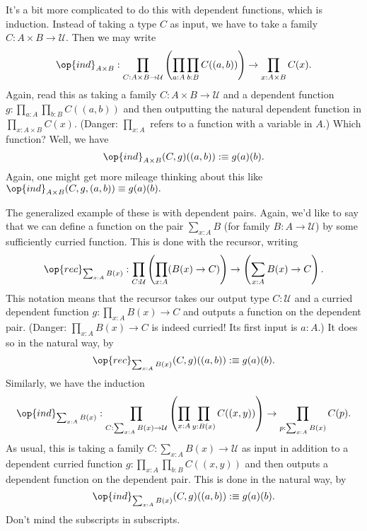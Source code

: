 It's a bit more complicated to do this with dependent functions, which is induction. Instead of taking a type $C$ as input, we have to take a family $C:A\times B\to\mathcal U.$ Then we may write
\[\op{ind}_{A\times B}:\prod_{C:A\times B\to\mathcal U}\left(\prod_{a:A}\prod_{b:B}C((a,b))\right)\to\prod_{x:A\times B}C(x).\]
Again, read this as taking a family $C:A\times B\to\mathcal U$ and a dependent function $g:\prod_{a:A}\prod_{b:B}C((a,b))$ and then outputting the natural dependent function in $\prod_{x:A\times B}C(x).$ (Danger: $\prod_{x:A}$ refers to a function with a variable in $A.$) Which function? Well, we have
\[\op{ind}_{A\times B}(C,g)((a,b)):\equiv g(a)(b).\]
Again, one might get more mileage thinking about this like $\op{ind}_{A\times B}(C,g,(a,b))\equiv g(a)(b).$

The generalized example of these is with dependent pairs. Again, we'd like to say that we can define a function on the pair $\sum_{x:A}B$ (for family $B:A\to\mathcal U$) by some sufficiently curried function. This is done with the recursor, writing
\[\op{rec}_{\sum_{x:A}B(x)}:\prod_{C:\mathcal U}\left(\prod_{x:A}(B(x)\to C)\right)\to\left(\sum_{x:A}B(x)\to C\right).\]
This notation means that the recursor takes our output type $C:\mathcal U$ and a curried dependent function $g:\prod_{x:A}B(x)\to C$ and outputs a function on the dependent pair. (Danger: $\prod_{x:A}B(x)\to C$ is indeed curried! Its first input is $a:A.$) It does so in the natural way, by
\[\op{rec}_{\sum_{x:A}B(x)}(C,g)((a,b)):\equiv g(a)(b).\]
Similarly, we have the induction
\[\op{ind}_{\sum_{x:A}B(x)}:\prod_{C:\sum_{x:A}B(x)\to\mathcal U}\left(\prod_{x:A}\prod_{y:B(x)}C((x,y))\right)\to\prod_{p:\sum_{x:A}B(x)}C(p).\]
As usual, this is taking a family $C:\sum_{x:A}B(x)\to\mathcal U$ as input in addition to a dependent curried function $g:\prod_{x:A}\prod_{b:B}C((x,y))$ and then outputs a dependent function on the dependent pair. This is done in the natural way, by
\[\op{ind}_{\sum_{x:A}B(x)}(C,g)((a,b)):\equiv g(a)(b).\]
Don't mind the subscripts in subscripts.

